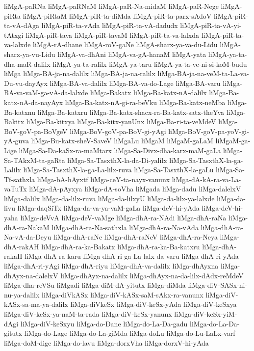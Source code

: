 {liMgA-paRNa
liMgA-paRNaM
liMgA-paR-Na-midaM
liMgA-paR-Nege
liMgA-piRta
liMgA-piRtaM
liMgA-piR-ta-diMda
liMgA-piR-ta-parx-sAdoV
liMgA-piR-ta-vA-dAga
liMgA-piR-ta-vAda
liMgA-piR-ta-vA-dadudx
liMgA-piR-ta-vA-yi-tAtxgi
liMgA-piR-tava
liMgA-piR-tavaM
liMgA-piR-ta-va-lalxda
liMgA-piR-ta-va-lalxde
liMgA-rA-dhane
liMgA-roV-gaNe
liMgA-sharx-ya-va-du-Lidu
liMgA-sharx-ya-vu-Lidu
liMgA-va-dhAni
liMgA-va-gA-hanaM
liMgA-yata
liMgA-ya-ta-dha-maR-dalilx
liMgA-ya-ta-ralilx
liMgA-ya-taru
liMgA-ya-ta-ve-ni-si-koM-budu
liMga
liMga-BA-ja-na-dalilx
liMga-BA-ja-na-ralilx
liMga-BA-ja-na-veM-ta-La-va-Du-vu-dayAyx
liMga-BA-va-dalilx
liMga-BA-va-do-Lage
liMga-BA-varu
liMga-BA-va-vaM-ga-vA-da-lalxde
liMga-Bakatx
liMga-Ba-katx-nA-dalilx
liMga-Ba-katx-nA-da-nayAyx
liMga-Ba-katx-nA-gi-ra-beVku
liMga-Ba-katx-neMba
liMga-Ba-katxnu
liMga-Ba-katxru
liMga-Ba-katx-shacx-ra-Ba-katx-satx-theYva
liMga-Bakitx
liMga-Ba-kitxya
liMga-Ba-kitx-yanUnx
liMga-Ba-ri-ta-veMdeV
liMga-BoV-goV-pa-BoVgeV
liMga-BoV-goV-pa-BoV-gi-yAgi
liMga-BoV-goV-pa-yoV-gi-yA-guva
liMga-Bu-katx-sheV-SaveV
liMgaLu
liMgaM
liMgaM-gaLaM
liMgaM-ga-Lige
liMga-Sa-Da-kaSx-ra-maMtarx
liMga-Sa-Divx-dha-karx-maM-gaLa
liMga-Sa-TAkxM-ta-gaRta
liMga-Sa-TasxthX-la-da-Di-yalilx
liMga-Sa-TasxthX-la-ga-Lalilx
liMga-Sa-TasxthX-la-ga-La-lilx-ruva
liMga-Sa-TasxthX-la-gaLu
liMga-Sa-Tf-sathxla
liMga-bA-hAyxtf
liMga-ceY-ta-nayx-vanunx
liMga-dA-kA-ra-va-La-vaTuTx
liMga-dA-pAyxya
liMga-dA-soVha
liMgada
liMga-dadu
liMga-dalelxV
liMga-dalilx
liMga-da-lilx-ruva
liMga-da-lilxyU
liMga-da-lilx-ya-lalxde
liMga-da-livu
liMga-daqSiTx
liMga-da-va-ya-vaM-gaLa
liMga-deV-hi-yAda
liMga-deV-hi-yaha
liMga-deVvA
liMga-deV-vaMge
liMga-dhA-ra-NAdi
liMga-dhA-raNa
liMga-dhA-ra-NakaM
liMga-dhA-ra-Na-sathxla
liMga-dhA-ra-Na-vAda
liMga-dhA-ra-Na-vA-da-Deyu
liMga-dhA-raNe
liMga-dhA-raNeV
liMga-dhA-ra-Neya
liMga-dhA-rakAH
liMga-dhA-ra-ka-Bakatx
liMga-dhA-ra-ka-Ba-katxru
liMga-dhA-rakaH
liMga-dhA-ra-karu
liMga-dhA-ri-ga-La-lalx-da-varu
liMga-dhA-ri-yAda
liMga-dhA-ri-yAgi
liMga-dhA-riyu
liMga-dhA-va-dalilx
liMga-dhAyxna
liMga-dhAyx-na-dalelxV
liMga-dhAyx-na-dalilx
liMga-dhAyx-na-da-lilx-dAdx-reMdeV
liMga-dha-reVSu
liMgadi
liMga-diM-dA-yitutx
liMga-diMda
liMga-diV-SASx-ni-nu-ya-dalilx
liMga-diVkASx
liMga-diV-kASx-saM-sAkx-ra-vanunx
liMga-diV-kASx-sa-ma-ya-dalilx
liMga-diVkeSx
liMga-diV-keSx-yAda
liMga-diV-keSxya
liMga-diV-keSx-ya-naM-ta-rada
liMga-diV-keSx-yanunx
liMga-diV-keSx-yiM-dAgi
liMga-diV-keSxyu
liMga-do-Dane
liMga-do-La-Da-gadu
liMga-do-La-Da-gitutx
liMga-do-Lage
liMga-do-La-giMda
liMga-doLu
liMga-do-Lu-LaLx-varf
liMga-doM-dige
liMga-do-lavu
liMga-dorxVha
liMga-dorxV-hi-yAda
}
